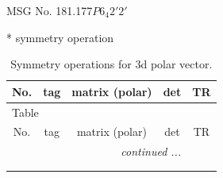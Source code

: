 \documentclass[fleqn,8pt]{jsarticle}
\begin{document}
\setcounter{MaxMatrixCols}{32}

\renewcommand{\tablename}{Table~}
\renewcommand{\figurename}{Figure~}
\begin{center}
\LARGE
MSG No. 181.177\quad$P6_{4}2'2'$
\end{center}
* symmetry operation
\renewcommand{\arraystretch}{1.3}
\begin{longtable}{ccccc}
\caption{Symmetry operations for 3d polar vector.}
 \\
 \hline \hline
No. & tag & matrix (polar) & det & TR \\ \hline \endfirsthead

\multicolumn{4}{l}{\tablename\ \thetable{}} \\
 \hline \hline
No. & tag & matrix (polar) & det & TR \\ \hline \endhead

 \hline \hline
\multicolumn{4}{r}{\footnotesize\it continued ...} \\ \endfoot

 \hline \hline
\multicolumn{4}{r}{} \\ \endlastfoot


\end{longtable}
\end{document}
